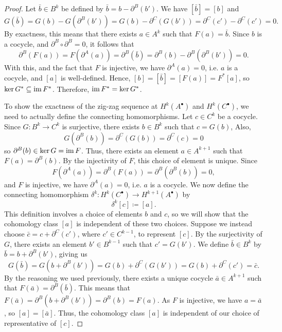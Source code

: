 \documentclass[a4paper,12pt]{article}
\begin{document}
\begin{proof}
    Let $\bar{b} \in B^k$ be defined by $\bar{b} = b - \partial^B(b')$.
    We have $[\bar{b}] = [b]$ and
    \begin{equation}
        G(\bar{b}) = G(b) - G(\partial^B(b')) = G(b) - \partial^C(G(b')) = \partial^C(c') - \partial^C(c') = 0.
    \end{equation}
    By exactness, this means that there exists $a \in A^k$ such that $F(a) = \bar{b}$.
    Since $b$ is a cocycle, and $\partial^B \circ \partial^B = 0$, it follows that
    \begin{equation}
        \partial^B(F(a)) = F(\partial^A(a)) = \partial^B(\bar{b}) = \partial^B(b) - \partial^B(\partial^B(b')) = 0.
    \end{equation}
    With this, and the fact that $F$ is injective, we have $\partial^A(a) = 0$, i.e. $a$ is a cocycle, and $[a]$ is well-defined.
    Hence, $[b] = [\bar{b}] = [F(a)] = F^*[a]$, so $\ker G^* \subseteq \operatorname{im} F^*$.
    Therefore, $\operatorname{im} F^* = \ker G^*$.

    To show the exactness of the zig-zag sequence at $H^k(A^\bullet)$ and $H^k(C^\bullet)$, we need to actually define the connecting homomorphisms.
    Let $c \in C^k$ be a cocycle.
    Since $G \colon B^k \to C^k$ is surjective, there exists $b \in B^k$ such that $c = G(b)$,
    Also,
    \begin{equation}
        G(\partial^B(b)) = \partial^C(G(b)) = \partial^C(c) = 0
    \end{equation}
    so $\partial^B(b) \in \ker G = \operatorname{im} F$.
    Thus, there exists an element $a \in A^{k+1}$ such that $F(a) = \partial^B(b)$.
    By the injectivity of $F$, this choice of element is unique.
    Since
    \begin{equation}
        F(\partial^A(a)) = \partial^B(F(a)) = \partial^B(\partial^B(b)) = 0,
    \end{equation}
    and $F$ is injective, we have $\partial^A(a) = 0$, i.e. $a$ is a cocycle.
    We now define the connecting homomorphism $\delta^k \colon H^k(C^\bullet) \to H^{k+1}(A^\bullet)$ by
    \begin{equation}
        \delta^k[c] \coloneq [a].
    \end{equation}
    This definition involves a choice of elements $b$ and $c$, so we will show that the cohomology class $[a]$ is independent of these two choices.
    Suppose we instead choose $\bar{c} = c + \partial^C(c')$, where $c' \in C^{k-1}$, to represent $[c]$.
    By the surjectivity of $G$, there exists an element $b' \in B^{k-1}$ such that $c' = G(b')$.
    We define $\bar{b} \in B^k$ by $\bar{b} = b + \partial^B(b')$, giving us
    \begin{equation}
        G(\bar{b}) = G(b + \partial^B(b')) = G(b) + \partial^C(G(b')) = G(b) + \partial^C(c') = \bar{c}.
    \end{equation}
    By the reasoning we used previously, there exists a unique cocycle $\bar{a} \in A^{k+1}$ such that $F(\bar{a}) = \partial^B(\bar{b})$.
    This means that $F(\bar{a}) = \partial^B(b + \partial^B(b')) = \partial^B(b) = F(a)$.
    As $F$ is injective, we have $a = \bar{a}$, so $[a] = [\bar{a}]$.
    Thus, the cohomology class $[a]$ is independent of our choice of representative of $[c]$.


\end{proof}
\end{document}
